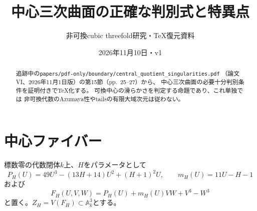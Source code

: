 \documentclass[a4paper,11pt]{ltjsarticle}
\title{中心三次曲面の正確な判別式と特異点}
\author{非可換cubic threefold研究・TeX復元資料}
\date{2026年11月10日・v1}
\begin{document}
\maketitle
\begin{abstract}
追跡中の\texttt{papers/pdf-only/boundary/central\_quotient\_singularities.pdf}
（論文VI、2026年11月1日版）の第15節（pp.~25--27）から、
中心三次曲面の必要十分判別条件を証明付きでTeX化する。
可換中心の滑らかさを判定する命題であり、これ単独では
非可換代数のAzumaya性やtailsの有限大域次元は従わない。
\end{abstract}
\section{中心ファイバー}
標数零の代数閉体$k$上、$H$をパラメータとして
\[
P_H(U)=49U^3-(13H+14)U^2+(H+1)^2U,\qquad
m_H(U)=11U-H-1
\]
および
\[
F_H(U,V,W)=P_H(U)+m_H(U)VW+V^3-W^3
\]
と置く。$Z_H=V(F_H)\subset\mathbb A^3_k$とする。
\end{document}
